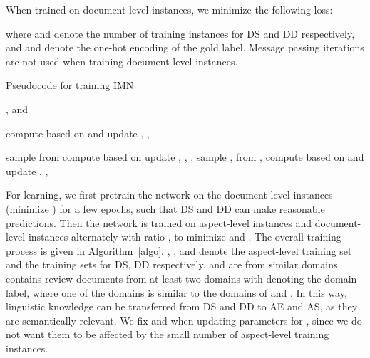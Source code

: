\documentclass[11pt,a4paper]{article}
\begin{document}
When trained on document-level instances, we minimize the following loss:

\noindent where  and  denote the number of training instances for DS and DD respectively, and  and  denote the one-hot encoding of the gold label. Message passing iterations are not used when training document-level instances.


\begin{algorithm}[t]
\caption{Pseudocode for training IMN }
\begin{algorithmic} 
\REQUIRE ,  and 
\REQUIRE 
\medskip

\FOR{}
     \STATE compute  based on  and 
     \STATE update , , 
     \ENDFOR
\ENDFOR
\medskip

\FOR{}
    \FOR{}
    \STATE sample  from 
    \STATE compute  based on 
    \STATE update , , , 
    \STATE sample ,  from , 
     \STATE compute  based on  and 
     \STATE update , , 
     \ENDIF
    \ENDFOR
\ENDFOR
\end{algorithmic}\label{algo}
\end{algorithm}

For learning, we first pretrain the network on the document-level instances (minimize ) for a few epochs, such that DS and DD can make reasonable predictions. Then the network is trained on aspect-level instances and document-level instances alternately with ratio , to minimize  and . The overall training process is given in Algorithm~\ref{algo}. , , and  denote the aspect-level training set and the training sets for DS, DD respectively.  and  are from similar domains.  contains review documents from at least two domains with  denoting the domain label, where one of the domains is similar to the domains of  and . In this way, linguistic knowledge can be transferred from DS and DD to AE and AS, as they are semantically relevant. We fix  and  when updating parameters for , since we do not want them to be affected by the small number of aspect-level training instances. 


\renewcommand{\arraystretch}{1.1}
\begin{table}[t]
\centering
\small
{}
\caption{Dataset statistics with numbers of aspect terms and opinion terms}\label{data}
\end{table}
\end{document}
